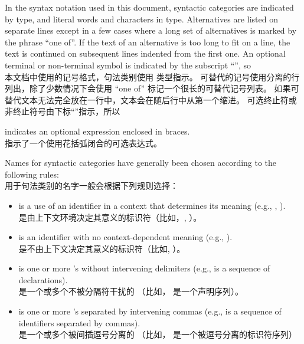 \pnum
{}%
In the syntax notation used in this document, syntactic
categories are indicated by  type, and literal words
and characters in   type. Alternatives are
listed on separate lines except in a few cases where a long set of
alternatives is marked by the phrase ``one of''. If the text of an alternative is too long to fit on a line, the text is continued on subsequent lines indented from the first one.
An optional terminal or non-terminal symbol is indicated by the subscript
``\opt{\relax}'', so \\
本文档中使用的记号格式，句法类别使用  类型指示。
可替代的记号使用分离的行列出，除了少数情况下会使用 ``one of'' 标记一个很长的可替代记号列表。
如果可替代文本无法完全放在一行中，文本会在随后行中从第一个缩进。
可选终止符或非终止符号由下标``\opt{\relax}''指示，所以

\begin{ncbnf}
\terminal{\{}  \terminal{\}}
\end{ncbnf}

indicates an optional expression enclosed in braces. \\ %
指示了一个使用花括弧闭合的可选表达式。

\pnum
Names for syntactic categories have generally been chosen according to
the following rules: \\
用于句法类别的名字一般会根据下列规则选择：
\begin{itemize}
\item {} is a use of an identifier in a context that
determines its meaning (e.g., ,
). \\
 是由上下文环境决定其意义的标识符（比如，, 
）。
\item {} is an identifier with no context-dependent meaning
(e.g., ). \\
 是不由上下文决定其意义的标识符（比如, ）。
\item {} is one or more 's without intervening
delimiters (e.g.,  is a sequence of
declarations). \\
 是一个或多个不被分隔符干扰的 
（比如， 是一个声明序列）。
\item {} is one or more 's separated by
intervening commas (e.g.,  is a sequence of
identifiers separated by commas). \\
 是一个或多个被间插逗号分离的 
（比如， 是一个被逗号分离的标识符序列）
\end{itemize}%

